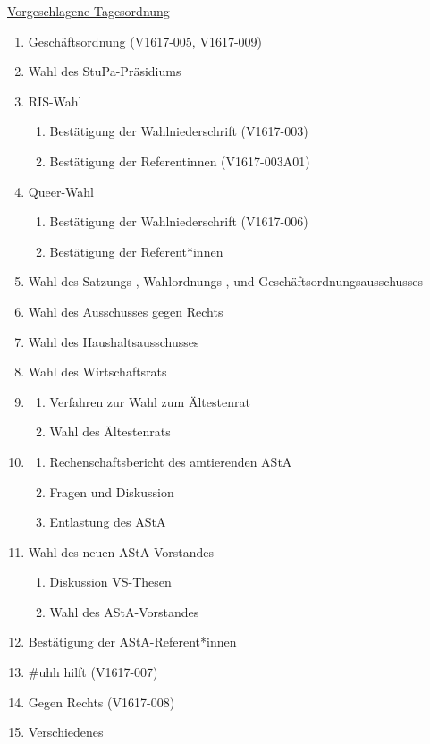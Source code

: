 \documentclass[ngerman,headheight=70pt]{scrartcl}
\begin{document}
    \underline{Vorgeschlagene Tagesordnung}
    \begin{enumerate}[label={\textbf{Top \theenumi}},leftmargin=*]
        \item Geschäftsordnung (V1617-005, V1617-009)
        \item Wahl des StuPa-Präsidiums
        \item RIS-Wahl
            \begin{enumerate}
                \item Bestätigung der Wahlniederschrift (V1617-003)
                \item Bestätigung der Referentinnen (V1617-003A01)
            \end{enumerate}
        \item Queer-Wahl
            \begin{enumerate}
                \item Bestätigung der Wahlniederschrift (V1617-006)
                \item Bestätigung der Referent*innen
            \end{enumerate}
        \item Wahl des Satzungs-, Wahlordnungs-, und Geschäftsordnungsausschusses
        \item Wahl des Ausschusses gegen Rechts
        \item Wahl des Haushaltsausschusses
        \item Wahl des Wirtschaftsrats
        \item
            \begin{enumerate}
                \item Verfahren zur Wahl zum Ältestenrat
                \item Wahl des Ältestenrats
            \end{enumerate}
        \item
            \begin{enumerate}
                \item Rechenschaftsbericht des amtierenden AStA
                \item Fragen und Diskussion
                \item Entlastung des AStA
            \end{enumerate}
        \item Wahl des neuen AStA-Vorstandes
            \begin{enumerate}
                \item Diskussion VS-Thesen
                \item Wahl des AStA-Vorstandes
            \end{enumerate}
        \item Bestätigung der AStA-Referent*innen
        \item \#uhh hilft (V1617-007)
        \item Gegen Rechts (V1617-008)
        \item Verschiedenes
    \end{enumerate}
\end{document}
